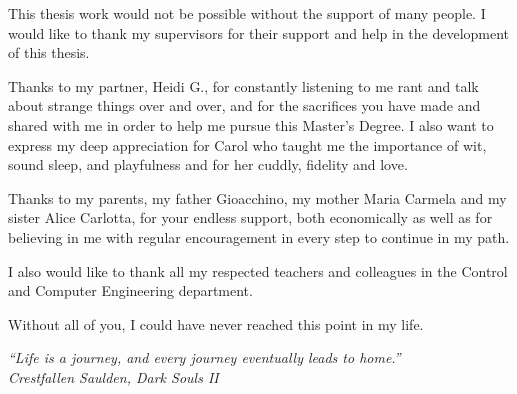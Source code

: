 
This thesis work would not be possible without the support of many people. I would like to thank my supervisors for their support and help in the development of this thesis.\bigskip

Thanks to my partner, Heidi G., for constantly listening to me rant and talk about strange things over and over, and for the sacrifices you have made and shared with me in order to help me pursue this Master's Degree. I also want to express my deep appreciation for Carol who taught me the importance of wit, sound sleep, and playfulness and for her cuddly, fidelity and love.\bigskip

Thanks to my parents, my father Gioacchino, my mother Maria Carmela and my sister Alice Carlotta, for your endless support, both economically as well as for believing in me with regular encouragement in every step to continue in my path.\bigskip

I also would like to thank all my respected teachers and colleagues in the Control and Computer Engineering department. \bigskip

Without all of you, I could have never reached this point in my life.


\vspace*{5\baselineskip}

\begin{flushright}
    \textit{``Life is a journey, and every journey eventually leads to home.''\\
    Crestfallen Saulden, Dark Souls II}
\end{flushright}
